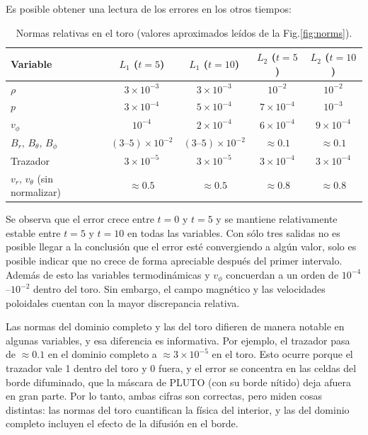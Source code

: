 \documentclass[11pt, letterpaper]{article}
\begin{document}
Es posible obtener una lectura de los errores en los otros tiempos:
\begin{table}[htbp]
  \centering
  \caption{Normas relativas en el toro (valores aproximados leídos de la Fig.\ref{fig:norms}).}
  \label{tab:normas}
  \begin{tabular}{lcccc}
    \toprule
    Variable & $L_1$ ($t=5$) & $L_1$ ($t=10$) & $L_2$ ($t=5$) & $L_2$ ($t=10$) \\
    \midrule
    $\rho$                     & $3\times10^{-3}$ & $3\times10^{-3}$ & $10^{-2}$        & $10^{-2}$ \\
    $p$                        & $3\times10^{-4}$ & $5\times10^{-4}$ & $7\times10^{-4}$ & $10^{-3}$ \\
    $v_\phi$                   & $10^{-4}$        & $2\times10^{-4}$ & $6\times10^{-4}$ & $9\times10^{-4}$ \\
    $B_r,\, B_\theta,\, B_\phi$ & $(3\text{--}5)\times10^{-2}$ & $(3\text{--}5)\times10^{-2}$ & $\approx0.1$ & $\approx0.1$ \\
    Trazador                   & $3\times10^{-5}$ & $3\times10^{-5}$ & $3\times10^{-4}$ & $3\times10^{-4}$ \\
    $v_r,\, v_\theta$ (sin normalizar) & $\approx0.5$ & $\approx0.5$ & $\approx0.8$ & $\approx0.8$ \\
    \bottomrule
  \end{tabular}
\end{table}

Se observa que el error crece entre $t=0$ y $t=5$ y se mantiene relativamente estable entre $t=5$ y $t=10$ en todas las variables. Con sólo tres salidas no es posible llegar a la conclusión que el error esté convergiendo a algún valor, solo es posible indicar que no crece de forma apreciable después del primer intervalo. Además de esto las variables termodinámicas y $v_{\phi}$ concuerdan a un orden de $10^{-4}$--$10^{-2}$ dentro del toro. Sin embargo, el campo magnético y las velocidades poloidales cuentan con la mayor discrepancia relativa.

\medskip

Las normas del dominio completo y las del toro difieren de manera notable en algunas variables, y esa diferencia es informativa. Por ejemplo, el trazador pasa de $\approx0.1$ en el dominio completo a $\approx3\times10^{-5}$ en el toro. Esto ocurre porque el trazador vale 1 dentro del toro y 0 fuera, y el error se concentra en las celdas del borde difuminado, que la máscara de PLUTO (con su borde nítido) deja afuera en gran parte. Por lo tanto, ambas cifras son correctas, pero miden cosas distintas: las normas del toro cuantifican la física del interior, y las del dominio completo incluyen el efecto de la difusión en el borde.
\end{document}
